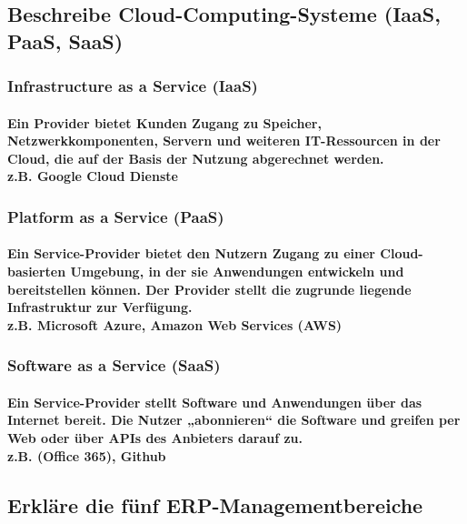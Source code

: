 \documentclass[a4paper]{article}
\begin{document}
    \subsection{\color{red}Beschreibe Cloud-Computing-Systeme (IaaS, PaaS, SaaS)}\label{subsec:beschreibe-cloud-computing-systeme-(iaas-paas-saas)}
    \subsubsection{\color{codegreen}Infrastructure as a Service (IaaS)}
    \paragraph{\color{codegreen}Ein Provider bietet Kunden Zugang zu Speicher, Netzwerkkomponenten, Servern und weiteren IT-Ressourcen in der Cloud, die auf der Basis der Nutzung abgerechnet werden.\\\color{red}z.B.
    Google Cloud Dienste}
    \subsubsection{\color{codegreen}Platform as a Service (PaaS)}
    \paragraph{\color{codegreen}Ein Service-Provider bietet den Nutzern Zugang zu einer Cloud-basierten Umgebung, in der sie Anwendungen entwickeln und bereitstellen können. Der Provider stellt die zugrunde liegende Infrastruktur zur Verfügung.\\\color{red}z.B.
    Microsoft Azure, Amazon Web Services (AWS)}
    \subsubsection{\color{codegreen}Software as a Service (SaaS)}
    \paragraph{\color{codegreen}Ein Service-Provider stellt Software und Anwendungen über das Internet bereit. Die Nutzer „abonnieren“ die Software und greifen per Web oder über APIs des Anbieters darauf zu.\\
    \color{red}z.B. (Office 365), Github}
    \subsection{\color{red}Erkläre die fünf ERP-Managementbereiche}\label{subsec:erkläre-die-fünf-erp-managementbereiche}
\end{document}
